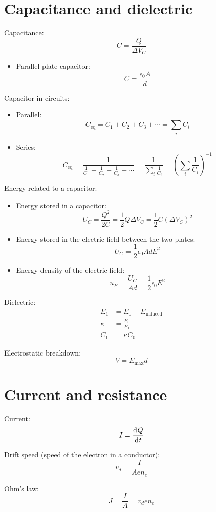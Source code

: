 \documentclass[10pt, twocolumn]{article}
\begin{document}
\section{Capacitance and dielectric}
Capacitance:
\[
  C = \frac{Q}{\Delta V_C }
\]
\begin{itemize}
  \item Parallel plate capacitor:
        \[
          C = \frac{\epsilon_0 A}{d}
        \]
\end{itemize}
Capacitor in circuits:
\begin{itemize}
  \item Parallel:
        \[
          C_{\mathrm{eq}} = C_1 + C_2 + C_3 + \cdots = \sum_i {C_i }
        \]
  \item Series:
        \[
          C_{\mathrm{eq}} = \frac{1}{\frac{1}{C_1 } + \frac{1}{C_2 } + \frac{1}{C_3 } + \cdots} = \frac{1}{\sum_i {\frac{1}{C_i }}} = \left( \sum_i {\frac{1}{C_i }} \right)^{-1}
        \]
\end{itemize}
Energy related to a capacitor:
\begin{itemize}
  \item Energy stored in a capacitor:
        \[
          U_C = \frac{Q^2 }{2C} = \frac{1}{2}Q\Delta V_C = \frac{1}{2}C\left( \Delta V_C \right)^2
        \]
  \item Energy stored in the electric field between the two plates:
        \[
          U_C = \frac{1}{2}\epsilon_0 AdE^2
        \]
  \item Energy density of the electric field:
        \[
          u_E = \frac{U_C }{Ad} = \frac{1}{2}\epsilon_0 E^2
        \]
\end{itemize}
Dielectric:
\begin{align*}
  E_1    & = E_0 - E_{\mathrm{induced}} \\
  \kappa & = \frac{E_0 }{E_1 }          \\
  C_1    & = \kappa C_0
\end{align*}

Electrostatic breakdown:
\[
  V = E_{\mathrm{max}}d
\]

\section{Current and resistance}
Current:
\[
  I = \frac{\mathrm{d}^{} Q}{\mathrm{d}^{} t}
\]

Drift speed (speed of the electron in a conductor):
\[
  v_d = \frac{I}{Aen_e }
\]

Ohm's law:
\[
  J = \frac{I}{A} = v_d en_e
\]
\end{document}
